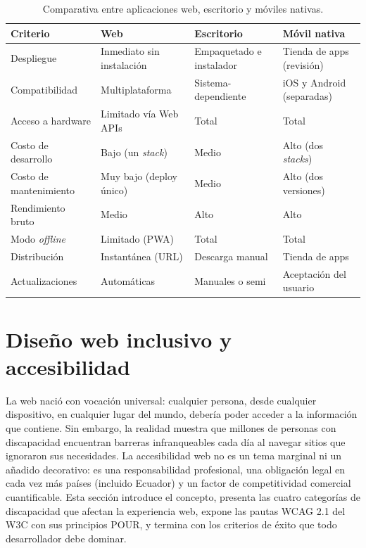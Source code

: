 \begin{table}[htbp]
\centering
\caption{Comparativa entre aplicaciones web, escritorio y móviles nativas.}
\footnotesize
\begin{tabularx}{\textwidth}{lXXX}
\toprule
\textbf{Criterio} & \textbf{Web} & \textbf{Escritorio} & \textbf{Móvil nativa}\\
\midrule
Despliegue & Inmediato sin instalación & Empaquetado e instalador & Tienda de apps (revisión)\\
Compatibilidad & Multiplataforma & Sistema-dependiente & iOS y Android (separadas)\\
Acceso a hardware & Limitado vía Web APIs & Total & Total\\
Costo de desarrollo & Bajo (un \emph{stack}) & Medio & Alto (dos \emph{stacks})\\
Costo de mantenimiento & Muy bajo (deploy único) & Medio & Alto (dos versiones)\\
Rendimiento bruto & Medio & Alto & Alto\\
Modo \emph{offline} & Limitado (PWA) & Total & Total\\
Distribución & Instantánea (URL) & Descarga manual & Tienda de apps\\
Actualizaciones & Automáticas & Manuales o semi & Aceptación del usuario\\
\bottomrule
\end{tabularx}
\end{table}

\section{Diseño web inclusivo y accesibilidad}

La web nació con vocación universal: cualquier persona, desde
cualquier dispositivo, en cualquier lugar del mundo, debería poder
acceder a la información que contiene. Sin embargo, la realidad
muestra que millones de personas con discapacidad encuentran
barreras infranqueables cada día al navegar sitios que ignoraron sus
necesidades. La accesibilidad web no es un tema marginal ni un
añadido decorativo: es una responsabilidad profesional, una
obligación legal en cada vez más países (incluido Ecuador) y un
factor de competitividad comercial cuantificable. Esta sección
introduce el concepto, presenta las cuatro categorías de
discapacidad que afectan la experiencia web, expone las pautas WCAG
2.1 del W3C con sus principios POUR, y termina con los criterios de
éxito que todo desarrollador debe dominar.

